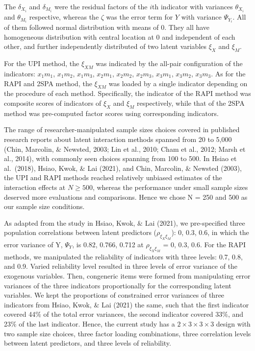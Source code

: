 \documentclass[
  man]{apa7}
\begin{document}
The \(\delta_{X_{i}}\) and \(\delta_{M_{i}}\) were the residual factors of the \(i\)th indicator with variances \(\theta_{X_{i}}\) and \(\theta_{M_{i}}\) respective, whereas the \(\zeta\) was the error term for \(Y\) with variance \(\Psi_{Y_{i}}\). All of them followed normal distribution with means of 0. They all have homogeneous distribution with central location at 0 and independent of each other, and further independently distributed of two latent variables \(\xi_{X}\) and \(\xi_{M}\).

For the UPI method, the \(\xi_{XM}\) was indicated by the all-pair configuration of the indicators: \(x_{1}m_{1}\), \(x_{1}m_{2}\), \(x_{1}m_{3}\), \(x_{2}m_{1}\), \(x_{2}m_{2}\), \(x_{2}m_{3}\), \(x_{3}m_{1}\), \(x_{3}m_{2}\), \(x_{3}m_{3}\). As for the RAPI and 2SPA method, the \(\xi_{XM}\) was loaded by a single indicator depending on the procedure of each method. Specifically, the indicator of the RAPI method was composite scores of indicators of \(\xi_{X}\) and \(\xi_{M}\) respectively, while that of the 2SPA method was pre-computed factor scores using corresponding indicators.

The range of researcher-manipulated sample sizes choices covered in published research reports about latent interaction methods spanned from 20 to 5,000 (Chin, Marcolin, \(\&\) Newsted, 2003; Lin et al., 2010; Cham et al., 2012; Marsh et al., 2014), with commonly seen choices spanning from 100 to 500. In Hsiao et al.~(2018), Hsiao, Kwok, \(\&\) Lai (2021), and Chin, Marcolin, \(\&\) Newsted (2003), the UPI and RAPI methods reached relatively unbiased estimates of the interaction effects at \(N \ge 500\), whereas the performance under small sample sizes deserved more evaluations and comparisons. Hence we chose N = 250 and 500 as our sample size conditions.

As adapted from the study in Hsiao, Kwok, \(\&\) Lai (2021), we pre-specified three population correlations between latent predictors (\(\rho_{\xi_{X}\xi_{M}}\)): 0, 0.3, 0.6, in which the error variance of Y, \(\Psi_{Y}\), is 0.82, 0.766, 0.712 at \(\rho_{\xi_{X}\xi_{M}}\) = 0, 0.3, 0.6. For the RAPI methods, we manipulated the reliability of indicators with three levels: 0.7, 0.8, and 0.9. Varied reliability level resulted in three levels of error variance of the exogenous variables. Then, congeneric items were formed from manipulating error variances of the three indicators proportionally for the corresponding latent variables. We kept the proportions of constrained error variances of three indicators from Hsiao, Kwok, \(\&\) Lai (2021) the same, such that the first indicator covered 44\(\%\) of the total error variances, the second indicator covered 33\(\%\), and 23\(\%\) of the last indicator. Hence, the current study has a \(2 \times 3 \times 3 \times 3\) design with two sample size choices, three factor loading combinations, three correlation levels between latent predictors, and three levels of reliability.
\end{document}
